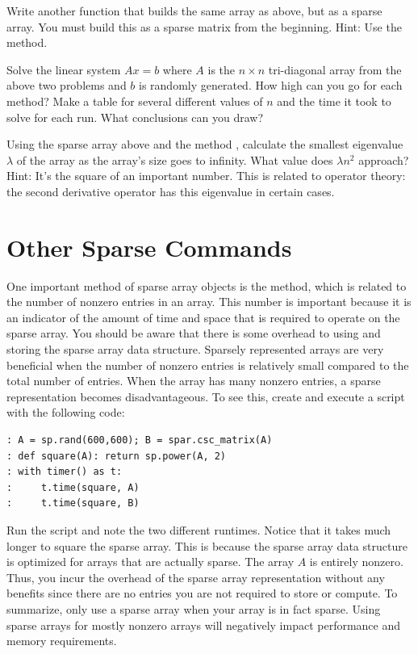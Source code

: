 \begin{problem}
Write another function that builds the same array as above, but as a sparse array. 
You must build this as a sparse matrix from the beginning. 
Hint: Use the  method.
\end{problem}

\begin{problem}
Solve the linear system $Ax = b$ where $A$ is the $n\times n$
tri-diagonal array from the above two problems and $b$ is randomly
generated.  How high can you go for each method?  Make a table for
several different values of $n$ and the time it took to solve for
each run.  What conclusions can you draw?
\end{problem}

\begin{problem}
Using the sparse array above and the method , 
calculate the smallest eigenvalue $\lambda$ of the array as the array's size goes to infinity. 
What value does $\lambda n^2$ approach?  
Hint: It's the square of an important number. 
This is related to operator theory: the second derivative operator has this eigenvalue in certain cases.
\end{problem}

\section*{Other Sparse Commands}

One important method of sparse array objects is the  method, 
which is related to the number of nonzero entries in an array.  
This number is important because it is an indicator of the amount of time and space
that is required to operate on the sparse array. 
You should be aware that there is some overhead to using and storing the sparse array data structure. 
Sparsely represented arrays are very beneficial when the number of 
nonzero entries is relatively small compared to the total number of entries. 
When the array has many nonzero entries, a sparse representation becomes disadvantageous. 
To see this, create and execute a script with the following code:
\begin{lstlisting}
: A = sp.rand(600,600); B = spar.csc_matrix(A)
: def square(A): return sp.power(A, 2)
: with timer() as t:
:     t.time(square, A)
:     t.time(square, B)
\end{lstlisting}
Run the script and note the two different runtimes. 
Notice that it takes much longer to square the sparse array.
This is because the sparse array data structure is optimized for arrays that are actually sparse.
The array $A$ is entirely nonzero. 
Thus, you incur the overhead of the sparse array representation without any 
benefits since there are no entries you are not required to store or compute.
To summarize, only use a sparse array when your array is in fact sparse. 
Using sparse arrays for mostly nonzero arrays will negatively impact performance and memory requirements.

